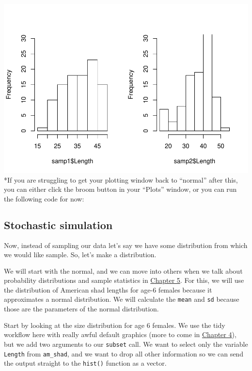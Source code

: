 \documentclass[
]{book}
\newenvironment{Shaded}{\begin{snugshade}}{\end{snugshade}}
\newcommand{\DataTypeTok}[1]{\textcolor[rgb]{0.13,0.29,0.53}{#1}}
\newcommand{\DecValTok}[1]{\textcolor[rgb]{0.00,0.00,0.81}{#1}}
\newcommand{\KeywordTok}[1]{\textcolor[rgb]{0.13,0.29,0.53}{\textbf{#1}}}
\newcommand{\NormalTok}[1]{#1}
\newcommand{\OperatorTok}[1]{\textcolor[rgb]{0.81,0.36,0.00}{\textbf{#1}}}
\newcommand{\OtherTok}[1]{\textcolor[rgb]{0.56,0.35,0.01}{#1}}
\newcommand{\StringTok}[1]{\textcolor[rgb]{0.31,0.60,0.02}{#1}}
\begin{document}
\includegraphics{worstr_files/figure-latex/unnamed-chunk-78-1.pdf}
*If you are struggling to get your plotting window back to ``normal'' after this, you can either click the broom button in your ``Plots'' window, or you can run the following code for now:

\hypertarget{stochastic}{%
\subsection{Stochastic simulation}\label{stochastic}}

Now, instead of sampling our data let's say we have some distribution from which we would like sample. So, let's make a distribution.

We will start with the normal, and we can move into others when we talk about probability distributions and sample statistics in \protect\hyperlink{Chapter5}{Chapter 5}. For this, we will use the distribution of American shad lengths for age-6 females because it approximates a normal distribution. We will calculate the \texttt{mean} and \texttt{sd} because those are the parameters of the normal distribution.

Start by looking at the size distribution for age 6 females. We use the tidy workflow here with really awful default graphics (more to come in \protect\hyperlink{Chapter4}{Chapter 4}), but we add two arguments to our \texttt{subset} call. We want to select only the variable \texttt{Length} from \texttt{am\_shad}, and we want to drop all other information so we can send the output straight to the \texttt{hist()} function as a vector.

\begin{Shaded}
\end{Shaded}
\end{document}
